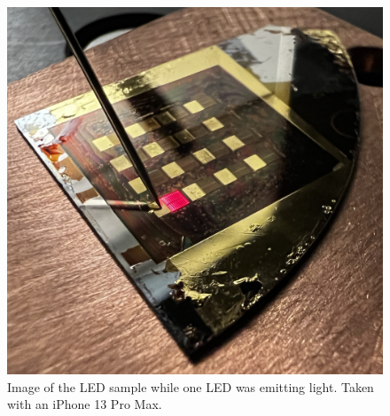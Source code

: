 \begin{figure}
    \centering
    \includegraphics[width=\linewidth]{figures/led_light.png}
    \caption{Image of the LED sample while one LED was emitting light. Taken with an iPhone 13 Pro Max.}
    \label{fig:led_light}
\end{figure}
